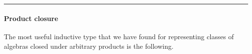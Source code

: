 \begin{code}
\AgdaSpace{}%
\AgdaSpace{}%
\AgdaSpace{}%
\AgdaSymbol{\{}\AgdaSymbol{\}\{}\AgdaSymbol{\}}\AgdaSpace{}%
\<%
\\
%
\>[2]%
\>[8]\AgdaSymbol{:}\AgdaSpace{}%
\AgdaSymbol{\{}\AgdaSpace{}%
\AgdaSymbol{:}\AgdaSpace{}%
\AgdaSpace{}%
\AgdaSpace{}%
\AgdaSymbol{\}\{}\AgdaSpace{}%
\AgdaSymbol{:}\AgdaSpace{}%
\AgdaSpace{}%
\AgdaSymbol{(}\AgdaSpace{}%
\AgdaSpace{}%
\AgdaSymbol{)}\AgdaSpace{}%
\AgdaSymbol{\}}\AgdaSpace{}%
\AgdaSpace{}%
\AgdaSpace{}%
\AgdaSpace{}%
\AgdaSymbol{\{}\AgdaSymbol{\}\{}\AgdaSymbol{\}}\AgdaSpace{}%
\AgdaSpace{}%
\AgdaSpace{}%
\AgdaSpace{}%
\AgdaSpace{}%
\AgdaSpace{}%
\AgdaSpace{}%
\AgdaSpace{}%
\AgdaSpace{}%
\AgdaSymbol{\{}\AgdaSymbol{\}\{}\AgdaSymbol{\}}\AgdaSpace{}%
\<%
\\
\>[0]\<%
\end{code}

\begin{center}\rule{0.5\linewidth}{\linethickness}\end{center}

\paragraph{Product closure}\label{product-closure}

The most useful inductive type that we have found for representing
classes of algebras closed under arbitrary products is the following.


